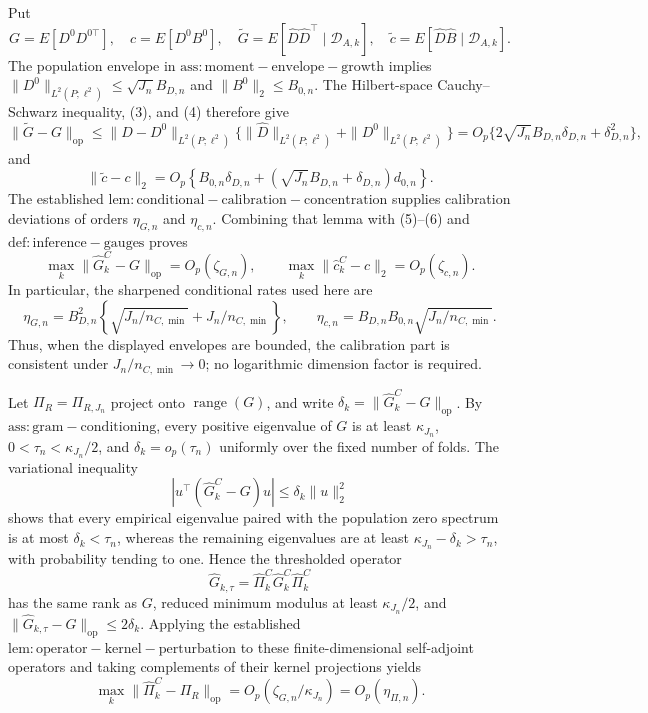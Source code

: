 Put
\[
 G=E[D^0D^{0\top}],\quad c=E[D^0B^0],\quad
 \widetilde G=E[\widehat D\widehat D^\top\mid\mathcal D_{A,k}],\quad
 \widetilde c=E[\widehat D\widehat B\mid\mathcal D_{A,k}].
\]
The population envelope in \(\mathrm{ass:moment-envelope-growth}\) implies
\(\|D^0\|_{L^2(P;\ell^2)}\le\sqrt{J_n}B_{D,n}\) and \(\|B^0\|_2\le B_{0,n}\).  The Hilbert-space Cauchy--Schwarz inequality, (3), and (4) therefore give
\[
 \|\widetilde G-G\|_{\mathrm{op}}
 \le \|\widehat D-D^0\|_{L^2(P;\ell^2)}
       \{\|\widehat D\|_{L^2(P;\ell^2)}+\|D^0\|_{L^2(P;\ell^2)}\}
 =O_p\{2\sqrt{J_n}B_{D,n}\delta_{D,n}+\delta_{D,n}^2\},                  \tag{5}
\]
and
\[
 \|\widetilde c-c\|_2
 =O_p\!\left\{B_{0,n}\delta_{D,n}
 +(\sqrt{J_n}B_{D,n}+\delta_{D,n})d_{0,n}\right\}.                       \tag{6}
\]
The established \(\mathrm{lem:conditional-calibration-concentration}\) supplies calibration deviations of orders \(\eta_{G,n}\) and \(\eta_{c,n}\).  Combining that lemma with (5)--(6) and \(\mathrm{def:inference-gauges}\) proves
\[
 \max_k\|\widehat G_k^C-G\|_{\mathrm{op}}=O_p(\zeta_{G,n}),\qquad
 \max_k\|\widehat c_k^C-c\|_2=O_p(\zeta_{c,n}).                          \tag{7}
\]
In particular, the sharpened conditional rates used here are
\[
 \eta_{G,n}=B_{D,n}^2\left\{\sqrt{J_n/n_{C,\min}}+J_n/n_{C,\min}\right\},
 \qquad
 \eta_{c,n}=B_{D,n}B_{0,n}\sqrt{J_n/n_{C,\min}}.
\]
Thus, when the displayed envelopes are bounded, the calibration part is consistent under \(J_n/n_{C,\min}\to0\); no logarithmic dimension factor is required.

Let \(\Pi_R=\Pi_{R,J_n}\) project onto \(\operatorname{range}(G)\), and write
\(\delta_k=\|\widehat G_k^C-G\|_{\mathrm{op}}\).  By \(\mathrm{ass:gram-conditioning}\), every positive eigenvalue of \(G\) is at least \(\kappa_{J_n}\), \(0<\tau_n<\kappa_{J_n}/2\), and \(\delta_k=o_p(\tau_n)\) uniformly over the fixed number of folds.  The variational inequality
\[
 |u^\top(\widehat G_k^C-G)u|\le\delta_k\|u\|_2^2                         \tag{8}
\]
shows that every empirical eigenvalue paired with the population zero spectrum is at most \(\delta_k<\tau_n\), whereas the remaining eigenvalues are at least \(\kappa_{J_n}-\delta_k>\tau_n\), with probability tending to one.  Hence the thresholded operator
\[
 \widehat G_{k,\tau}=\widehat\Pi_k^C\widehat G_k^C\widehat\Pi_k^C
\]
has the same rank as \(G\), reduced minimum modulus at least \(\kappa_{J_n}/2\), and
\(\|\widehat G_{k,\tau}-G\|_{\mathrm{op}}\le2\delta_k\).  Applying the established \(\mathrm{lem:operator-kernel-perturbation}\) to these finite-dimensional self-adjoint operators and taking complements of their kernel projections yields
\[
 \max_k\|\widehat\Pi_k^C-\Pi_R\|_{\mathrm{op}}
 =O_p(\zeta_{G,n}/\kappa_{J_n})=O_p(\eta_{\Pi,n}).                         \tag{9}
\]


